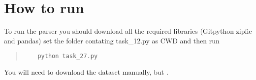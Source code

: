 \documentclass[11pt]{article}
\begin{document}
\section{How to run}
To run the parser you should download all the required libraries (Gitpython zipfie and pandas) set the folder contating 
task\_12.py as CWD and then run
\begin{quote}
  \begin{verbatim}
    python task_27.py
  \end{verbatim}
\end{quote}
\noindent You will need to download the dataset manually, but .
\end{document}

